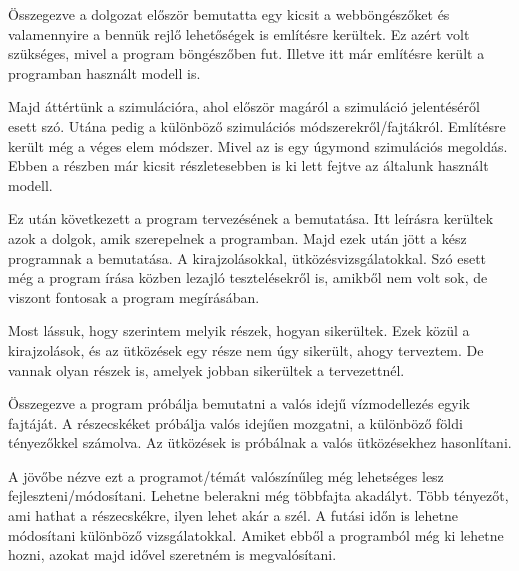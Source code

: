 


Összegezve a dolgozat először bemutatta egy kicsit a webböngészőket és valamennyire a bennük rejlő lehetőségek is említésre kerültek. Ez azért volt szükséges, mivel a program böngészőben fut. Illetve itt már említésre került a programban használt modell is. 

Majd áttértünk a szimulációra, ahol először magáról a szimuláció jelentéséről esett szó. Utána pedig a különböző szimulációs módszerekről/fajtákról. Említésre került még a véges elem módszer. Mivel az is egy úgymond szimulációs megoldás. Ebben a részben már kicsit részletesebben is ki lett fejtve az általunk használt modell.

Ez után következett a program tervezésének a bemutatása. Itt leírásra kerültek azok a dolgok, amik szerepelnek a programban.
Majd ezek után jött a kész programnak a bemutatása. A kirajzolásokkal, ütközésvizsgálatokkal. 
Szó esett még a program írása közben lezajló tesztelésekről is, amikből nem volt sok, de viszont fontosak a program megírásában. 

Most lássuk, hogy szerintem melyik részek, hogyan sikerültek. Ezek közül a kirajzolások, és az ütközések egy része nem úgy sikerült, ahogy terveztem.
De vannak olyan részek is, amelyek jobban sikerültek a tervezettnél. 

Összegezve a program próbálja bemutatni a valós idejű vízmodellezés egyik fajtáját. 
A részecskéket próbálja valós idejűen mozgatni, a különböző földi tényezőkkel számolva. 
Az ütközések is próbálnak a valós ütközésekhez hasonlítani. 

A jövőbe nézve ezt a programot/témát valószínűleg még lehetséges lesz fejleszteni/módosítani.
Lehetne belerakni még többfajta akadályt. Több tényezőt, ami hathat a részecskékre, ilyen lehet akár a szél. 
A futási időn is lehetne módosítani különböző vizsgálatokkal. 
Amiket ebből a programból még ki lehetne hozni, azokat majd idővel szeretném is megvalósítani. 
